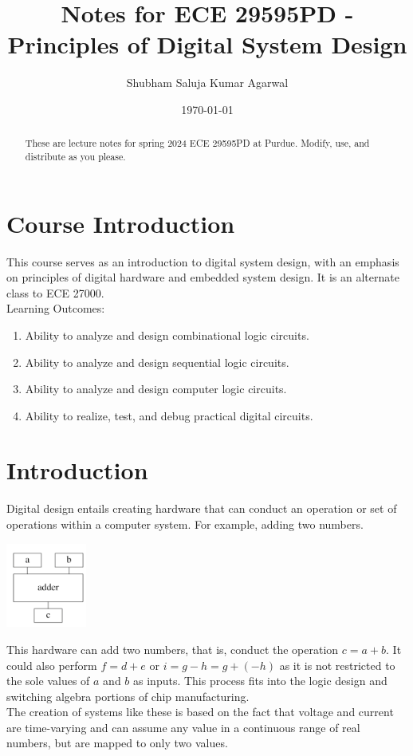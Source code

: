 \documentclass[nobib]{tufte-handout}
\title{Notes for ECE 29595PD - Principles of Digital System Design}
\author[Shubham Saluja Kumar Agarwal]{Shubham Saluja Kumar Agarwal}
\date{\today}  %
\begin{document}
\maketitle

\begin{abstract}
    These are lecture notes for spring 2024 ECE 29595PD at Purdue. Modify, use, and distribute as you please.
\end{abstract}

\tableofcontents

\section{Course Introduction}

This course serves as an introduction to digital system design, with an
emphasis on principles of digital hardware and embedded system design. It is an
alternate class to ECE 27000. \\ Learning Outcomes:
\begin{enumerate}
    \item Ability to analyze and design combinational logic circuits.
    \item Ability to analyze and design sequential logic circuits.
    \item Ability to analyze and design computer logic circuits.
    \item Ability to realize, test, and debug practical digital circuits.
\end{enumerate}

\pagebreak

\section{Introduction}

Digital design entails creating hardware that can conduct an operation or set
of operations within a computer system. For example, adding two numbers. \\
\begin{center}
    \includegraphics[width= 100px]{images/Screenshot 2024-01-08 151414.png}
\end{center}
This hardware can add two numbers, that is, conduct the operation $c=a+b$. It could also perform $f=d+e$ or $i=g-h=g+(-h)$ as it is not restricted to the sole values of $a$ and $b$ as inputs. This process fits into the logic design and switching algebra portions of chip manufacturing.\\
The creation of systems like these is based on the fact that voltage and current are time-varying and can assume any value in a continuous range of real numbers, but are mapped to only two values.
\end{document}
